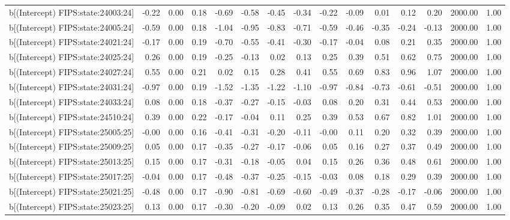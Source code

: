 \begin{table}[ht]
\begin{tabular}{rrrrrrrrrrrrrrr}
  b[(Intercept) FIPS:state:24003:24] & -0.22 & 0.00 & 0.18 & -0.69 & -0.58 & -0.45 & -0.34 & -0.22 & -0.09 & 0.01 & 0.12 & 0.20 & 2000.00 & 1.00 \\ 
  b[(Intercept) FIPS:state:24005:24] & -0.59 & 0.00 & 0.18 & -1.04 & -0.95 & -0.83 & -0.71 & -0.59 & -0.46 & -0.35 & -0.24 & -0.13 & 2000.00 & 1.00 \\ 
  b[(Intercept) FIPS:state:24021:24] & -0.17 & 0.00 & 0.19 & -0.70 & -0.55 & -0.41 & -0.30 & -0.17 & -0.04 & 0.08 & 0.21 & 0.35 & 2000.00 & 1.00 \\ 
  b[(Intercept) FIPS:state:24025:24] & 0.26 & 0.00 & 0.19 & -0.25 & -0.13 & 0.02 & 0.13 & 0.25 & 0.39 & 0.51 & 0.62 & 0.75 & 2000.00 & 1.00 \\ 
  b[(Intercept) FIPS:state:24027:24] & 0.55 & 0.00 & 0.21 & 0.02 & 0.15 & 0.28 & 0.41 & 0.55 & 0.69 & 0.83 & 0.96 & 1.07 & 2000.00 & 1.00 \\ 
  b[(Intercept) FIPS:state:24031:24] & -0.97 & 0.00 & 0.19 & -1.52 & -1.35 & -1.22 & -1.10 & -0.97 & -0.84 & -0.73 & -0.61 & -0.51 & 2000.00 & 1.00 \\ 
  b[(Intercept) FIPS:state:24033:24] & 0.08 & 0.00 & 0.18 & -0.37 & -0.27 & -0.15 & -0.03 & 0.08 & 0.20 & 0.31 & 0.44 & 0.53 & 2000.00 & 1.00 \\ 
  b[(Intercept) FIPS:state:24510:24] & 0.39 & 0.00 & 0.22 & -0.17 & -0.04 & 0.11 & 0.25 & 0.39 & 0.53 & 0.67 & 0.82 & 1.01 & 2000.00 & 1.00 \\ 
  b[(Intercept) FIPS:state:25005:25] & -0.00 & 0.00 & 0.16 & -0.41 & -0.31 & -0.20 & -0.11 & -0.00 & 0.11 & 0.20 & 0.32 & 0.39 & 2000.00 & 1.00 \\ 
  b[(Intercept) FIPS:state:25009:25] & 0.05 & 0.00 & 0.17 & -0.35 & -0.27 & -0.17 & -0.06 & 0.05 & 0.16 & 0.27 & 0.37 & 0.49 & 2000.00 & 1.00 \\ 
  b[(Intercept) FIPS:state:25013:25] & 0.15 & 0.00 & 0.17 & -0.31 & -0.18 & -0.05 & 0.04 & 0.15 & 0.26 & 0.36 & 0.48 & 0.61 & 2000.00 & 1.00 \\ 
  b[(Intercept) FIPS:state:25017:25] & -0.04 & 0.00 & 0.17 & -0.48 & -0.37 & -0.25 & -0.15 & -0.03 & 0.08 & 0.18 & 0.29 & 0.39 & 2000.00 & 1.00 \\ 
  b[(Intercept) FIPS:state:25021:25] & -0.48 & 0.00 & 0.17 & -0.90 & -0.81 & -0.69 & -0.60 & -0.49 & -0.37 & -0.28 & -0.17 & -0.06 & 2000.00 & 1.00 \\ 
  b[(Intercept) FIPS:state:25023:25] & 0.13 & 0.00 & 0.17 & -0.30 & -0.20 & -0.09 & 0.02 & 0.13 & 0.26 & 0.35 & 0.47 & 0.59 & 2000.00 & 1.00 \\ 

\end{tabular}
\end{table}
